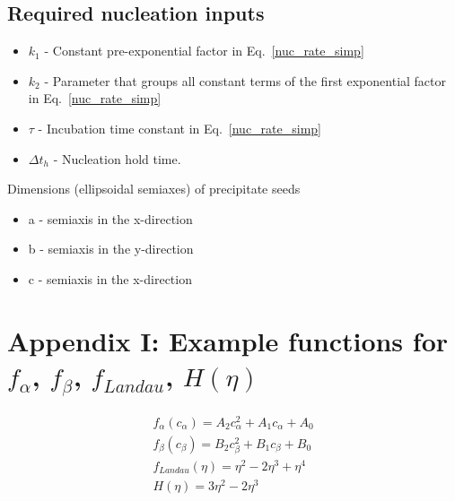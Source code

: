 \documentclass[11pt]{article}
\renewcommand{\=}[1]{\stackrel{#1}{=}} %
\theoremstyle{definition}
\theoremstyle{remark}
\begin{document}
\subsection{Required nucleation inputs}
\begin{itemize}
\item $k_1$ - Constant pre-exponential factor in Eq.~\eqref{nuc_rate_simp}
\item $k_2$ - Parameter that groups all constant terms of the first exponential factor in Eq.~\eqref{nuc_rate_simp} 
\item $\tau$ - Incubation time constant in Eq.~\eqref{nuc_rate_simp}
\item $\Delta t_h$ - Nucleation hold time.
\end{itemize}
Dimensions (ellipsoidal semiaxes) of precipitate seeds
\begin{itemize}
\item a - semiaxis in the x-direction
\item b - semiaxis in the y-direction
\item c - semiaxis in the x-direction
\end{itemize}

\section*{Appendix I: Example functions for $f_{\alpha}$, $f_{\beta}$, $f_{Landau}$, $H(\eta)$ }
\begin{gather}
f_{\alpha}(c_{\alpha}) = A_{2} c_{\alpha}^2 + A_{1} c_{\alpha} + A_{0} \\
f_{\beta}(c_{\beta}) = B_{2} c_{\beta}^2 + B_{1} c_{\beta} + B_{0} \\
f_{Landau}(\eta) = \eta^2  - 2\eta^3 +  \eta^4\\
H(\eta) = 3 \eta^2 - 2 \eta^3
\end{gather}
\end{document}
